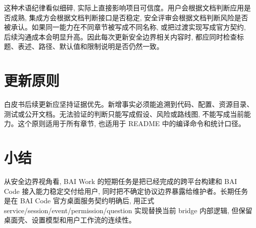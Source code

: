 这种术语纪律看似细碎, 实际上直接影响项目可信度。用户会根据文档判断应用是否成熟, 集成方会根据文档判断接口是否稳定, 安全评审会根据文档判断风险是否被承认。如果同一能力在不同章节被写成不同名称, 或把过渡实现写成官方契约, 后续沟通成本会明显升高。因此每次更新安全边界相关内容时, 都应同时检查标题、表述、路径、默认值和限制说明是否仍然一致。

\section{更新原则}
白皮书后续更新应坚持证据优先。新增事实必须能追溯到代码、配置、资源目录、测试或公开文档。无法验证的判断只能写成假设、风险或路线图, 不能写成当前能力。这个原则适用于所有章节, 也适用于 README 中的编译命令和统计口径。

\section{小结}
从安全边界视角看, BAI Work 的短期任务是把已经完成的跨平台构建和 BAI Code 接入能力稳定交付给用户, 同时把不确定协议边界暴露给维护者。长期任务是在 BAI Code 官方桌面服务契约明确后, 用正式 service/session/event/permission/question 实现替换当前 bridge 内部逻辑, 但保留桌面壳、设置模型和用户工作流的连续性。
